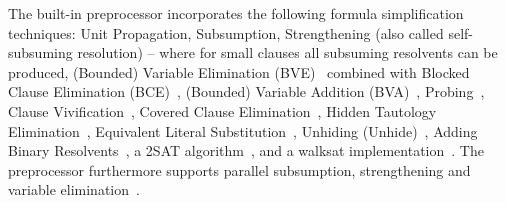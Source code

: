 \documentclass[conference]{IEEEtran}
\begin{document}
The built-in preprocessor \coprocessor incorporates the following formula simplification techniques:
Unit Propagation, Subsumption, Strengthening (also called self-subsuming resolution) -- where for small clauses all subsuming resolvents can be produced, 
{(Bounded) Variable Elimination} ({BVE})~\cite{EenB:2005} combined with Blocked Clause Elimination (BCE)~\cite{JarvisaloBH:2010}, 
{(Bounded) Variable Addition} ({BVA})~\cite{MantheyHB:2012}, 
{Probing}~\cite{LynceJM:2003}, 
{Clause Vivification}~\cite{Piette:2008:VPC:1567281.1567396}, 
{Covered Clause Elimination}~\cite{HeuleJB10b}, 
{Hidden Tautology Elimination}~\cite{HeuleJB10}, 
{Equivalent Literal Substitution}~\cite{ee-withSCC}, 
{Unhiding} ({Unhide})~\cite{DBLP:conf/sat/HeuleJB11}, 
{Adding Binary Resolvents}~\cite{Wei:2002:ARW:647489.727142}, 
a 2SAT algorithm~\cite{DBLP:conf/aaai/Val00}, and a walksat implementation~\cite{DBLP:conf/aaai/SelmanKC94}. 
The preprocessor furthermore supports parallel subsumption, strengthening and variable elimination~\cite{GebhardManthey:KI:2013}. 
\end{document}
